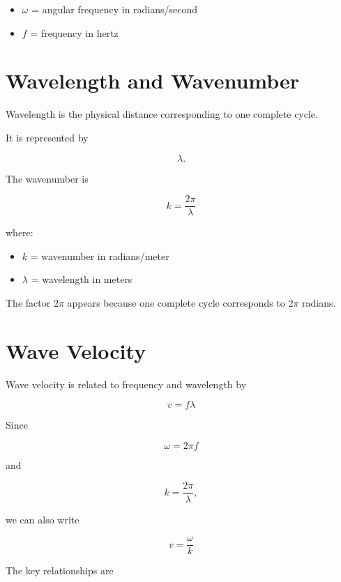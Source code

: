 \documentclass[11pt]{article}
\begin{document}
\begin{itemize}
    \item $\omega$ = angular frequency in radians/second
    \item $f$ = frequency in hertz
\end{itemize}



\section{Wavelength and Wavenumber}

Wavelength is the physical distance corresponding to one complete cycle.

It is represented by

\[
\lambda.
\]

The wavenumber is

\[
\boxed{
k=\frac{2\pi}{\lambda}
}
\]

where:

\begin{itemize}
    \item $k$ = wavenumber in radians/meter
    \item $\lambda$ = wavelength in meters
\end{itemize}

The factor $2\pi$ appears because one complete cycle corresponds to $2\pi$ radians.



\section{Wave Velocity}

Wave velocity is related to frequency and wavelength by

\[
\boxed{
v=f\lambda
}
\]

Since

\[
\omega=2\pi f
\]

and

\[
k=\frac{2\pi}{\lambda},
\]

we can also write

\[
\boxed{
v=\frac{\omega}{k}
}
\]

The key relationships are
\end{document}
